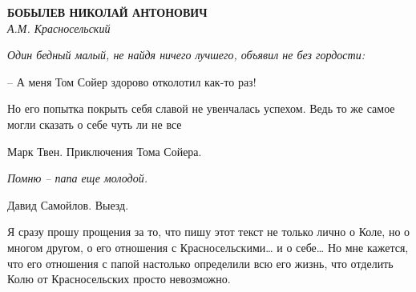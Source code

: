 \begin{center}{ \bf  БОБЫЛЕВ НИКОЛАЙ АНТОНОВИЧ}\\
{\it А.М. Красносельский} \\
\end{center}

\begin{flushright}
{\it Один бедный малый, не найдя ничего лучшего, объявил не без гордости:

 – А меня Том Сойер здорово отколотил как-то раз!

 Но его попытка покрыть себя  славой  не  увенчалась успехом. Ведь то же
 самое могли сказать о себе чуть ли не все }

Марк Твен. Приключения Тома Сойера.

{\it Помню – папа еще молодой.}

Давид Самойлов. Выезд.
\end{flushright}

Я сразу прошу прощения  за то, что пишу этот текст не только лично о Коле, но о многом другом, о его отношения с Красносельскими… и о себе… Но мне кажется, что его отношения с папой настолько определили всю его жизнь, что отделить Колю от Красносельских просто невозможно.

